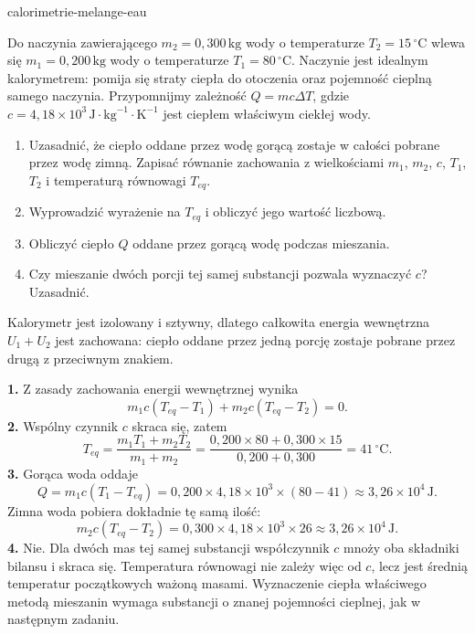 \begin{exo}{calorimetrie-melange-eau}

Do naczynia zawierającego $m_2=0{,}300\,\text{kg}$ wody o temperaturze $T_2=15\,^\circ\text{C}$ wlewa się $m_1=0{,}200\,\text{kg}$ wody o temperaturze $T_1=80\,^\circ\text{C}$. Naczynie jest idealnym kalorymetrem: pomija się straty ciepła do otoczenia oraz pojemność cieplną samego naczynia. Przypomnijmy zależność $Q=mc\Delta T$, gdzie $c=4{,}18\times10^3\,\text{J}\!\cdot\!\text{kg}^{-1}\!\cdot\!\text{K}^{-1}$ jest ciepłem właściwym ciekłej wody.

\begin{enumerate}
  \item Uzasadnić, że ciepło oddane przez wodę gorącą zostaje w całości pobrane przez wodę zimną. Zapisać równanie zachowania z wielkościami $m_1$, $m_2$, $c$, $T_1$, $T_2$ i temperaturą równowagi $T_{eq}$.
  \item Wyprowadzić wyrażenie na $T_{eq}$ i obliczyć jego wartość liczbową.
  \item Obliczyć ciepło $Q$ oddane przez gorącą wodę podczas mieszania.
  \item Czy mieszanie dwóch porcji tej samej substancji pozwala wyznaczyć $c$? Uzasadnić.
\end{enumerate}

\begin{indication}
Kalorymetr jest izolowany i sztywny, dlatego całkowita energia wewnętrzna $U_1+U_2$ jest zachowana: ciepło oddane przez jedną porcję zostaje pobrane przez drugą z przeciwnym znakiem.
\end{indication}

\begin{solution}
\textbf{1.} Z zasady zachowania energii wewnętrznej wynika
\[
m_1c(T_{eq}-T_1)+m_2c(T_{eq}-T_2)=0.
\]
\textbf{2.} Wspólny czynnik $c$ skraca się, zatem
\[
T_{eq}=\frac{m_1T_1+m_2T_2}{m_1+m_2}
=\frac{0{,}200\times80+0{,}300\times15}{0{,}200+0{,}300}
=41\,^\circ\text{C}.
\]
\textbf{3.} Gorąca woda oddaje
\[
Q=m_1c(T_1-T_{eq})
=0{,}200\times4{,}18\times10^3\times(80-41)
\approx3{,}26\times10^4\,\text{J}.
\]
Zimna woda pobiera dokładnie tę samą ilość:
\[
m_2c(T_{eq}-T_2)=0{,}300\times4{,}18\times10^3\times26
\approx3{,}26\times10^4\,\text{J}.
\]
\textbf{4.} Nie. Dla dwóch mas tej samej substancji współczynnik $c$ mnoży oba składniki bilansu i skraca się. Temperatura równowagi nie zależy więc od $c$, lecz jest średnią temperatur początkowych ważoną masami. Wyznaczenie ciepła właściwego metodą mieszanin wymaga substancji o znanej pojemności cieplnej, jak w następnym zadaniu.
\end{solution}
\end{exo}


